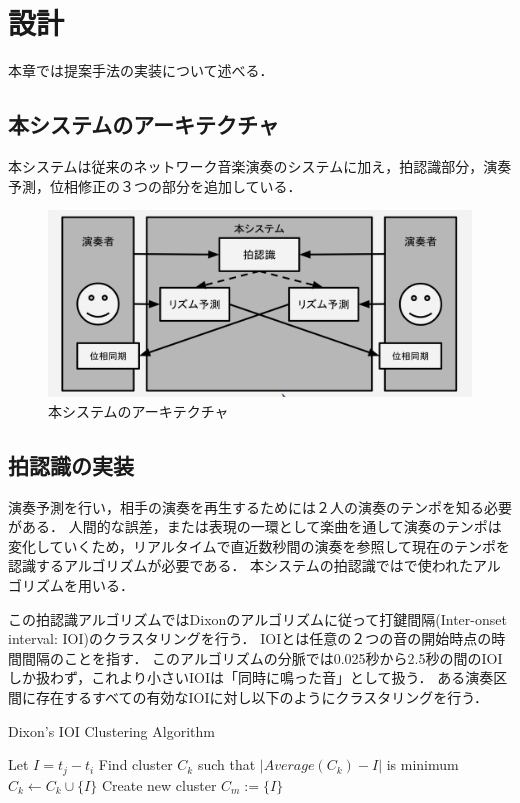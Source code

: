 \chapter{設計}
\label{implementation}

本章では提案手法の実装について述べる．

\section{本システムのアーキテクチャ}
本システムは従来のネットワーク音楽演奏のシステムに加え，拍認識部分，演奏予測，位相修正の３つの部分を追加している．
\begin{figure}[htbp]
  \centering
  \includegraphics[width=0.8\linewidth]{src/architecture.png}
  \caption{本システムのアーキテクチャ}
  \label{fig:architecture}
\end{figure}


\section{拍認識の実装}
演奏予測を行い，相手の演奏を再生するためには２人の演奏のテンポを知る必要がある．
人間的な誤差，または表現の一環として楽曲を通して演奏のテンポは変化していくため，リアルタイムで直近数秒間の演奏を参照して現在のテンポを認識するアルゴリズムが必要である．
本システムの拍認識では\cite{dixon:2000}で使われたアルゴリズムを用いる．

この拍認識アルゴリズムではDixonのアルゴリズム\cite{dixon}に従って打鍵間隔(Inter-onset interval: IOI)のクラスタリングを行う．
IOIとは任意の２つの音の開始時点の時間間隔のことを指す．
このアルゴリズムの分脈では0.025秒から2.5秒の間のIOIしか扱わず，これより小さいIOIは「同時に鳴った音」として扱う．
ある演奏区間に存在するすべての有効なIOIに対し以下のようにクラスタリングを行う．

\begin{algorithm}
  \caption{Dixon's IOI Clustering Algorithm}
\begin{algorithmic}[1]
        \State Let \( I = t_j - t_i \)
        \State Find cluster \( C_k \) such that \( | Average ( C_k ) - I | \) is minimum
            \State \( C_k \gets C_k \cup \{ I \} \)
        \Else
            \State Create new cluster \( C_m := \{ I \} \)
        \EndIf
    \EndIf
\EndFor
\end{algorithmic}
\end{algorithm}


